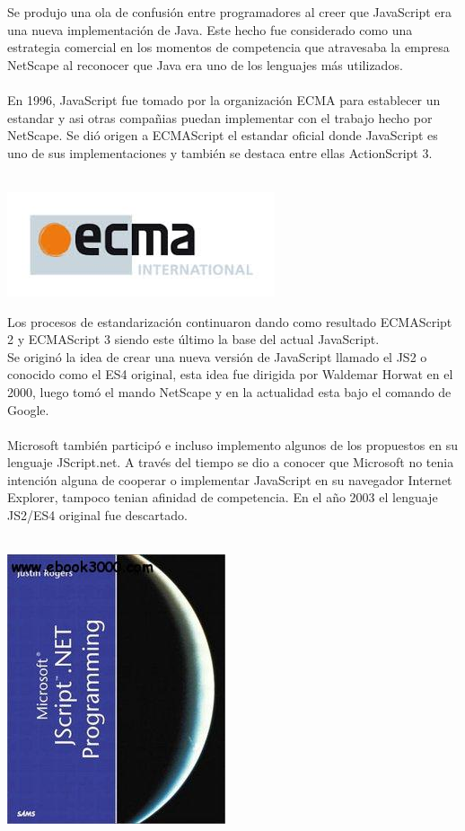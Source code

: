 \documentclass[11pt]{article} %
\begin{document}
Se produjo una ola de confusión entre programadores al creer que JavaScript era una nueva implementación de Java. Este hecho fue considerado como una estrategia comercial en los momentos de competencia que atravesaba la empresa NetScape al reconocer que Java era uno de los lenguajes más utilizados.\\\\
En 1996, JavaScript fue tomado por la organización ECMA para establecer un estandar y asi otras compañias puedan implementar con el trabajo hecho por NetScape. Se dió origen a ECMAScript el estandar oficial donde JavaScript es uno de sus implementaciones y también se destaca entre ellas ActionScript 3.\\\\
\begin{center}
\includegraphics[scale=0.5]{imagenes/ecma.JPG}
\end{center}
Los procesos de estandarización continuaron dando como resultado ECMAScript 2 y ECMAScript 3 siendo este último la base del actual JavaScript.\\
Se originó la idea de crear una nueva versión de JavaScript llamado el JS2 o conocido como el ES4 original, esta idea fue dirigida por Waldemar Horwat en el 2000, luego tomó el mando NetScape y en la actualidad esta bajo el comando de Google.\\\\
Microsoft también participó e incluso implemento algunos de los propuestos en su lenguaje JScript.net. A través del tiempo se dio a conocer que Microsoft no tenia intención alguna de cooperar o implementar JavaScript en su navegador Internet Explorer, tampoco tenian afinidad de competencia. En el año 2003 el lenguaje JS2/ES4 original fue descartado.\\\\
\begin{center}
\includegraphics[scale=0.5]{imagenes/jscript.JPG}
\end{center}
\end{document}
